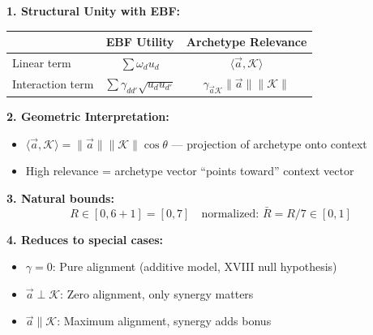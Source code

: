 \begin{tcolorbox}[colback=green!5!white, colframe=green!75!black,
    title=\textbf{Why This Formulation Is Elegant}]

\textbf{1. Structural Unity with EBF:}
\begin{center}
\begin{tabular}{@{}lcc@{}}
\toprule
& \textbf{EBF Utility} & \textbf{Archetype Relevance} \\
\midrule
Linear term & $\sum \omega_d u_d$ & $\langle \vec{a}, \mathcal{K} \rangle$ \\
Interaction term & $\sum \gamma_{dd'} \sqrt{u_d u_{d'}}$ & $\gamma_{\vec{a}\mathcal{K}} \|\vec{a}\| \|\mathcal{K}\|$ \\
\bottomrule
\end{tabular}
\end{center}

\textbf{2. Geometric Interpretation:}
\begin{itemize}[nosep]
    \item $\langle \vec{a}, \mathcal{K} \rangle = \|\vec{a}\| \|\mathcal{K}\| \cos\theta$ --- projection of archetype onto context
    \item High relevance = archetype vector ``points toward'' context vector
\end{itemize}

\textbf{3. Natural bounds:}
\begin{equation}
R \in [0, 6 + 1] = [0, 7] \quad \text{normalized: } \bar{R} = R/7 \in [0, 1]
\end{equation}

\textbf{4. Reduces to special cases:}
\begin{itemize}[nosep]
    \item $\gamma = 0$: Pure alignment (additive model, XVIII null hypothesis)
    \item $\vec{a} \perp \mathcal{K}$: Zero alignment, only synergy matters
    \item $\vec{a} \parallel \mathcal{K}$: Maximum alignment, synergy adds bonus
\end{itemize}

\end{tcolorbox}

